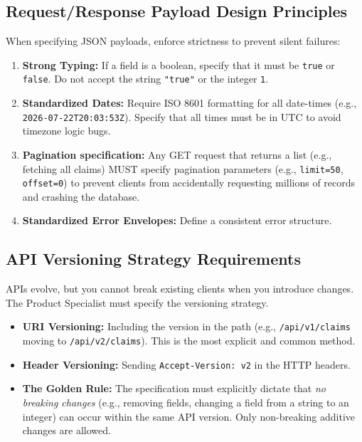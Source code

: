 \subsection{Request/Response Payload Design
Principles}\label{requestresponse-payload-design-principles}

When specifying JSON payloads, enforce strictness to prevent silent
failures:

\begin{enumerate}
\def\labelenumi{\arabic{enumi}.}
\tightlist
\item
  \textbf{Strong Typing:} If a field is a boolean, specify that it must
  be \texttt{true} or \texttt{false}. Do not accept the string
  \texttt{"true"} or the integer \texttt{1}.
\item
  \textbf{Standardized Dates:} Require ISO 8601 formatting for all
  date-times (e.g., \texttt{2026-07-22T20:03:53Z}). Specify that all
  times must be in UTC to avoid timezone logic bugs.
\item
  \textbf{Pagination specification:} Any GET request that returns a list
  (e.g., fetching all claims) MUST specify pagination parameters (e.g.,
  \texttt{limit=50}, \texttt{offset=0}) to prevent clients from
  accidentally requesting millions of records and crashing the database.
\item
  \textbf{Standardized Error Envelopes:} Define a consistent error
  structure.
\end{enumerate}

\subsection{API Versioning Strategy
Requirements}\label{api-versioning-strategy-requirements}

APIs evolve, but you cannot break existing clients when you introduce
changes. The Product Specialist must specify the versioning strategy.

\begin{itemize}
\tightlist
\item
  \textbf{URI Versioning:} Including the version in the path (e.g.,
  \texttt{/api/v1/claims} moving to \texttt{/api/v2/claims}). This is
  the most explicit and common method.
\item
  \textbf{Header Versioning:} Sending \texttt{Accept-Version:\ v2} in
  the HTTP headers.
\item
  \textbf{The Golden Rule:} The specification must explicitly dictate
  that \emph{no breaking changes} (e.g., removing fields, changing a
  field from a string to an integer) can occur within the same API
  version. Only non-breaking additive changes are allowed.
\end{itemize}

